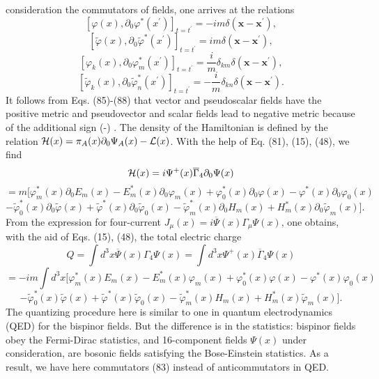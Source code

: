 \documentclass[a4paper,12pt]{article}
\begin{document}
consideration the commutators of fields, one arrives at the
relations
\begin{equation}
\left[ \varphi (x),\partial_0 \varphi^{*}(x^{\prime })\right]
_{t=t^{\prime }}=-im\delta (\mathbf{x}-\mathbf{x}^{\prime }) ,
\label{85}
\end{equation}
\begin{equation}
\left[ \widetilde{ \varphi }(x),\partial_0 \widetilde{\varphi
}^{*}(x^{\prime })\right] _{t=t^{\prime }}=im\delta
(\mathbf{x}-\mathbf{x}^{\prime }) , \label{86}
\end{equation}
\begin{equation}
\left[ \varphi_k(x),\partial_0 \varphi _{m}^{*}(x^{\prime
})\right] _{t=t^{\prime }}=\frac{i}{m}\delta _{km}\delta
(\mathbf{x}-\mathbf{x}^{\prime }) ,\label{87}
\end{equation}
\begin{equation}
\left[ \widetilde{\varphi} _k(x),\partial_0
\widetilde{\varphi}_{n}^{*}(x^{\prime })\right] _{t=t^{\prime
}}=-\frac{i}{m}\delta _{kn}\delta (\mathbf{x}-\mathbf{x}^{\prime
}) . \label{88}
\end{equation}
It follows from Eqs. (85)-(88) that vector and pseudoscalar fields
have the positive metric and pseudovector and scalar fields lead
to negative metric because of the additional sign (-)
\cite{monogr}. The density of the Hamiltonian is defined by the
relation ${\cal H}(x)=\pi_A (x) \partial_0 \Psi_A (x)-{\cal
L}(x)$. With the help of Eq. (81), (15), (48), we find
\[
{\cal H}(x)=i\Psi^+ (x)\overline{\Gamma}_4 \partial_0 \Psi (x)
\]
\begin{equation}
=m\biggl [\varphi_m^* (x)\partial_0 E_m (x) - E_m^* (x)\partial_0
\varphi_m (x)+\varphi_0^* (x)\partial_0 \varphi (x)-\varphi^*
(x)\partial_0 \varphi_0 (x) \label{89}
\end{equation}
\[
- \widetilde{\varphi}_0^* (x)\partial_0
\widetilde{\varphi}(x)+\widetilde{\varphi}^* (x)\partial_0
\widetilde{\varphi}_0 (x)- \widetilde{\varphi}_m^* (x)\partial_0
H_m (x) + H_m^* (x)\partial_0 \widetilde{\varphi}_m (x)\biggr ] .
\]
From the expression for four-current $J_\mu
(x)=i\overline{\Psi}(x)\Gamma_\mu \Psi (x)$, one obtains, with the
aid of Eqs. (15), (48), the total electric charge
\[
Q=\int d^3 x\overline{\Psi}(x)\Gamma_4 \Psi (x)=\int d^3 x\Psi^+
(x)\overline{\Gamma}_4 \Psi (x)
\]
\begin{equation}
 =-im\int d^3 x\biggl [\varphi_m^*
(x)E_m (x) - E_m^* (x)\varphi_m (x)+\varphi_0^* (x)\varphi (x)
-\varphi^* (x)\varphi_0 (x)
 \label{90}
\end{equation}
\[
- \widetilde{\varphi}_0^*
(x)\widetilde{\varphi}(x)+\widetilde{\varphi}^* (x)
\widetilde{\varphi}_0 (x)- \widetilde{\varphi}_m^* (x)H_m (x) +
H_m^* (x)\widetilde{\varphi}_m (x)\biggr ] .
\]
The quantizing procedure here is similar to one in quantum
electrodynamics (QED) for the bispinor fields. But the difference
is in the statistics: bispinor fields obey the Fermi-Dirac
statistics, and 16-component fields $\Psi (x)$ under
consideration, are bosonic fields satisfying the Bose-Einstein
statistics. As a result, we have here commutators (83) instead of
anticommutators in QED.
\end{document}
